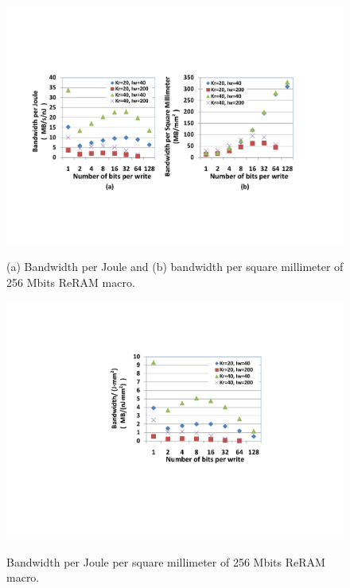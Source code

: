 \begin{figure}[!]
\centering\label{fig:BWpAE_2}
  \includegraphics[width=3.5 in]{./figures/BWpAE}\\  \vspace{-4pt}
  \caption{(a) Bandwidth per Joule and (b) bandwidth per square millimeter of 256 Mbits ReRAM macro.}
  \vspace{-5pt}
\end{figure}
\begin{figure}[!]
\centering\label{fig:BWpAE2}
  \includegraphics[width=2 in]{./figures/BWpAE2}\\\vspace{-4pt}
  \caption{Bandwidth per Joule per square millimeter of 256 Mbits ReRAM macro.}
  \vspace{-15pt}
\end{figure}

